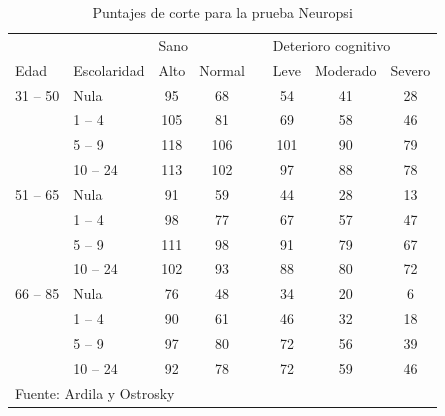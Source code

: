 \documentclass[12pt,letterpaper]{book}
\begin{document}
\begin{table}
\centering
\caption{Puntajes de corte para la prueba Neuropsi}
\begin{tabular}{llccrccc}
\toprule
&& \multicolumn{2}{l}{Sano} & \phantom{.} & \multicolumn{3}{l}{Deterioro cognitivo} \\
\cmidrule{3-4} \cmidrule{6-8} 
Edad & Escolaridad & Alto & Normal && Leve & Moderado & Severo\\
\midrule
31 -- 50  
& Nula     & 95  & 68  &  & 54  & 41 & 28 \\
& 1 -- 4   & 105 & 81  &  & 69  & 58 & 46 \\
& 5 -- 9   & 118 & 106 &  & 101 & 90 & 79 \\
& 10 -- 24 & 113 & 102 &  & 97  & 88 & 78 \\
\midrule
51 -- 65  
& Nula     & 91  & 59  &  & 44  & 28 & 13 \\
& 1 -- 4   & 98  & 77  &  & 67  & 57 & 47 \\
& 5 -- 9   & 111 & 98  &  & 91  & 79 & 67 \\
& 10 -- 24 & 102 & 93  &  & 88  & 80 & 72 \\
\midrule
66 -- 85  
& Nula     & 76  & 48  &  & 34  & 20 & 6 \\
& 1 -- 4   & 90  & 61  &  & 46  & 32 & 18 \\
& 5 -- 9   & 97  & 80  &  & 72  & 56 & 39 \\
& 10 -- 24 & 92  & 78  &  & 72  & 59 & 46 \\
\bottomrule
\multicolumn{7}{l}{Fuente: Ardila y Ostrosky \cite{Ardila12}}
\end{tabular}
\label{anexo:neuropsi}
\end{table}
\end{document}
